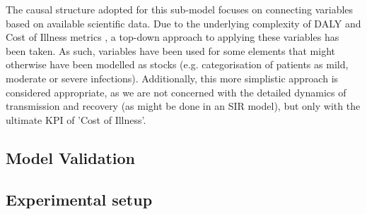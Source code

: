 The causal structure adopted for this sub-model focuses on connecting variables based on available scientific data. Due to the underlying complexity of DALY and Cost of Illness metrics \parencite{jo_cost--illness_2014}, a top-down approach to applying these variables has been taken. As such, variables have been used for some elements that might otherwise have been modelled as stocks (e.g. categorisation of patients as mild, moderate or severe infections). Additionally, this more simplistic approach is considered appropriate, as we are not concerned with the detailed dynamics of transmission and recovery (as might be done in an SIR model), but only with the ultimate KPI of 'Cost of Illness'.

\subsection{Model Validation}
    
\subsection{Experimental setup}



